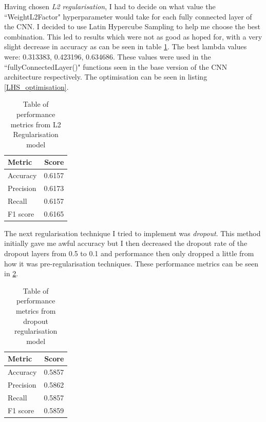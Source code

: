 \documentclass[11pt, letterpaper]{article}
\begin{document}
Having chosen \textit{L2 regularisation}, I had to decide on what value the ``WeightL2Factor" hyperparameter would take for each fully connected layer of the CNN. I decided to use Latin Hypercube Sampling \cite{LHS} to help me choose the best combination. This led to results which were not as good as hoped for, with a very slight decrease in accuracy as can be seen in table \ref{tab:L2RegularisationPerformanceMetrics}. The best lambda values were: 0.313383, 0.423196, 0.634686. These values were used in the ``fullyConnectedLayer()" functions seen in the base version of the CNN architecture respectively. The optimisation can be seen in listing \ref{LHS_optimisation}.

\begin{table}[ht]
  \begin{center}
    \caption{Table of performance metrics from L2 Regularisation model}
    \label{tab:L2RegularisationPerformanceMetrics}
    \begin{tabular}{l|r} %
      \textbf{Metric} & \textbf{Score}\\
      \hline
      Accuracy & 0.6157\\
      Precision & 0.6173\\
      Recall & 0.6157\\
      F1 score & 0.6165\\
    \end{tabular}
  \end{center}
\end{table}

The next regularisation technique I tried to implement was \textit{dropout}. This method initially gave me awful accuracy but I then decreased the dropout rate of the dropout layers from 0.5 to 0.1 and performance then only dropped a little from how it was pre-regularisation techniques. These performance metrics can be seen in \ref{tab:DropoutRegularisationPerformanceMetrics}.

\begin{table}[ht]
    \begin{center}
      \caption{Table of performance metrics from dropout regularisation model}
      \label{tab:DropoutRegularisationPerformanceMetrics}
      \begin{tabular}{l|r} %
        \textbf{Metric} & \textbf{Score}\\
        \hline
        Accuracy & 0.5857\\
        Precision & 0.5862\\
        Recall & 0.5857\\
        F1 score & 0.5859\\
      \end{tabular}
    \end{center}
  \end{table}
\end{document}
